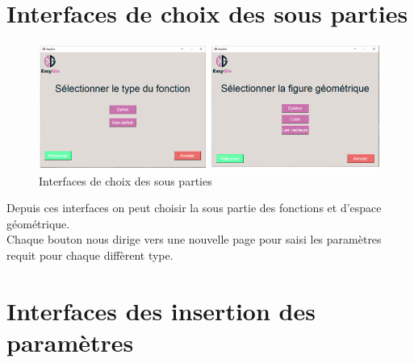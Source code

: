 \documentclass[a4paper]{report}
\begin{document}
\section{Interfaces de choix des sous parties}
\begin{figure}[!h]
    \centering
    \includegraphics[width=15cm]{images/TypesCaptures.PNG}
    \caption{Interfaces de choix des sous parties}
    \label{fig:Interfaces de choix des sous parties}
\end{figure}
Depuis ces interfaces on peut choisir la sous partie des fonctions et d'espace géométrique.\\
Chaque bouton nous dirige vers une nouvelle page pour saisi les paramètres requit pour chaque diffèrent type.
\newpage
\section{Interfaces des insertion des paramètres}
\end{document}
